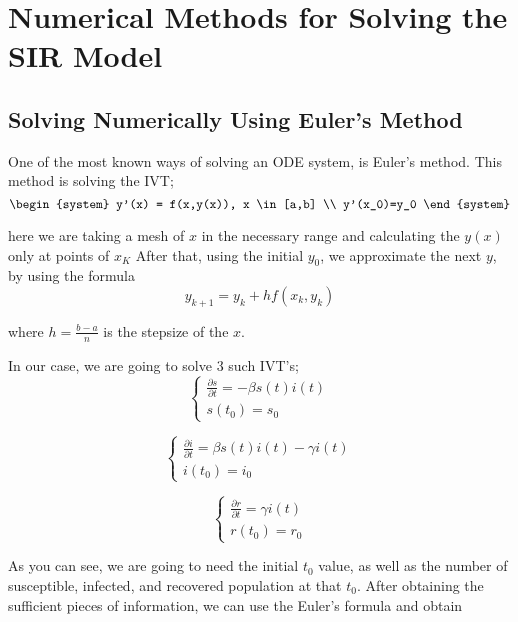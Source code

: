 \section{Numerical Methods for Solving the SIR Model}\label{Numerical_Methods}\thispagestyle{SectionFirstPage} %
\subsection{Solving Numerically Using Euler's Method}\label{multicollinearity}

\hspace{\parindent} One of the most known ways of solving an ODE system, is Euler's method. This method is solving the IVT;
\begin{equation}
	\begin{system}
		y'(x) = f(x,y(x)), x \in [a,b]
		\\
		y'(x_0)=y_0 
	\end{system}
\end{equation}

\par here we are taking a mesh of $x$ in the necessary range and calculating the $y(x)$ only at points of $x_K$
After that, using the initial $y_0$, we approximate the next $y$, by using the formula
\begin{equation}
	y_{k+1} = y_k + h f(x_k,y_k)
\end{equation}
\par where $h=\frac{b-a}{n}$ is the stepsize of the $x$.
\par In our case, we are going to solve 3 such IVT's;
\[
	\left\{
		\begin{array}{l}
			\frac{\partial s}{\partial t} = -\beta s(t)  i(t)  \\
			s(t_0)=s_0
		\end{array}
	\right.
\]

\[
	\left\{
		\begin{array}{l}
			\frac{\partial i}{\partial t} = \beta s(t)  i(t) - \gamma i(t) \\
			i(t_0)=i_0
		\end{array}
	\right.
\]

\[
	\left\{
		\begin{array}{l}
			\frac{\partial r}{\partial t} = \gamma i(t) \\
			r(t_0)=r_0
		\end{array}
	\right.
\]

\par As you can see, we are going to need the initial $t_0$ value, as well as the number
of susceptible, infected, and recovered population at that $t_0$.
After obtaining the sufficient pieces of information, we can use the Euler's formula and obtain

